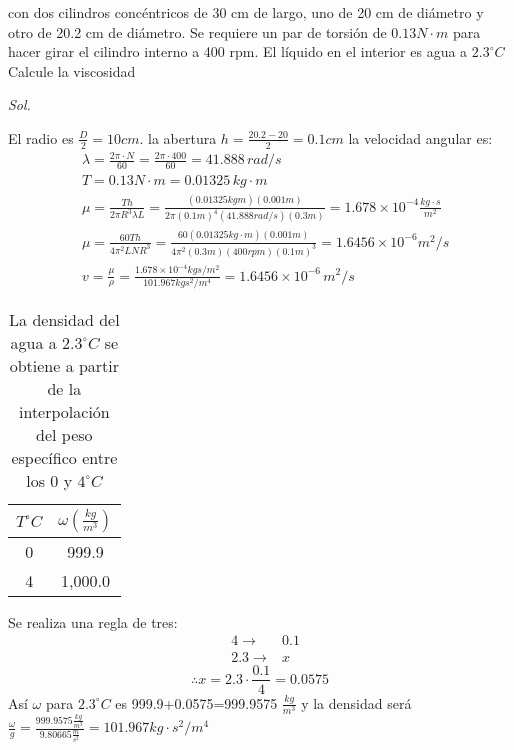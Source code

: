 \begin{problem}
    con dos cilindros concéntricos de 30 cm de largo, uno de 20 cm de diámetro y otro de 20.2 cm de diámetro. Se requiere un par de torsión de $0.13N\cdot m$ para hacer girar el cilindro interno a 400 rpm. El líquido en el interior es agua a $2.3^{\circ}C$ Calcule la viscosidad
\end{problem}

\textit{ Sol. }

El radio es $\frac{D}{2}=10cm$. la abertura $h=\frac{20.2-20}{2}=0.1cm$
la velocidad angular es:
\begin{align*}
    &\lambda=\frac{2\pi\cdot N}{60}=\frac{2\pi\cdot 400}{60}=41.888\, rad/s\\
    &T=0.13N\cdot m=0.01325\, kg\cdot m\\
    &\mu=\frac{Th}{2\pi R^3\lambda L}=\frac{(0.01325kgm)(0.001m)}{2\pi(0.1m)^4(41.888rad/s)(0.3m)}=1.678\times 10^{-4}\frac{kg\cdot s}{m^2}\\
    &\mu=\frac{60Th}{4\pi^2 LNR^3}=\frac{60(0.01325kg\cdot m)(0.001m)}{4\pi^2(0.3m)(400rpm)(0.1m)^3}=1.6456\times 10^{-6}m^2/s\\
    &v=\frac{\mu}{\rho}=\frac{1.678\times 10^{-4}kgs/m^2}{101.967kgs^2/m^4}=1.6456\times 10^{-6}\, m^2/s
\end{align*}

\begin{table}[h!]
    \centering\begin{tabular}{@{}cc@{}}
    \toprule
    $T^{\circ}C$ & $\omega (\frac{kg}{m^3})$ \\ \midrule
    0            & 999.9             \\
    4            & 1,000.0            \\ \bottomrule
    \end{tabular}
    \caption{La densidad del agua a $2.3^{\circ}C$ se obtiene a partir de la interpolación del peso específico entre los 0 y $4^{\circ}C$}
    \label{tabhb2}
\end{table}

Se realiza una regla de tres:
\begin{align*}
    &4\longrightarrow &0.1\\
    &2.3\longrightarrow &x
\end{align*}
\begin{equation*}
    \therefore x=2.3\cdot \frac{0.1}{4}=0.0575
\end{equation*}
Así $\omega$ para $2.3^{\circ}C$ es 999.9+0.0575=999.9575 $\frac{kg}{m^3}$
y la densidad será $\frac{\omega}{g}=\frac{999.9575\frac{kg}{m^3}}{9.80665\frac{m}{s^2}}=101.967kg\cdot s^2/m^4$



